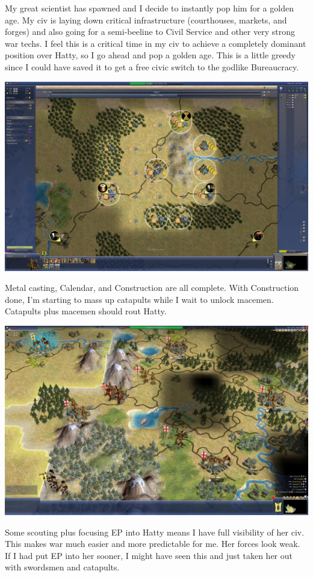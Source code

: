 \documentclass[10pt]{article}
\begin{document}
My great scientist has spawned and I decide to instantly pop him for a golden age. My civ is laying down critical
infrastructure (courthouses, markets, and forges) and also going for a semi-beeline to Civil Service and other very
strong war techs. I feel this is a critical time in my civ to achieve a completely dominant position over Hatty, so
I go ahead and pop a golden age. This is a little greedy since I could have saved it to get a free civic switch to
the godlike Bureaucracy.

\includegraphics[width=1.0\textwidth]{120}

Metal casting, Calendar, and Construction are all complete. With Construction done, I'm starting to mass up catapults
while I wait to unlock macemen. Catapults plus macemen should rout Hatty.

\includegraphics[width=1.0\textwidth]{121}

Some scouting plus focusing EP into Hatty means I have full visibility of her civ. This makes war much easier
and more predictable for me. Her forces look weak. If I had put EP into her sooner, I might have seen this and just
taken her out with swordsmen and catapults.
\end{document}

